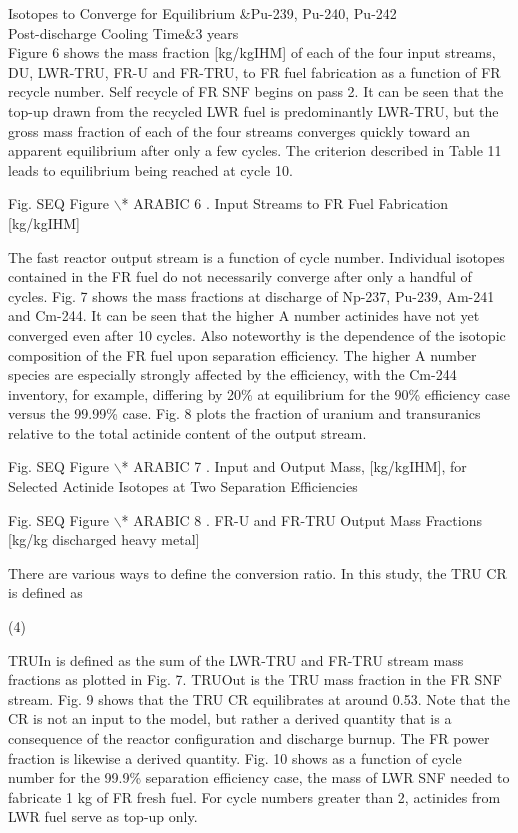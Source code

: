 Isotopes to Converge for Equilibrium &Pu-239, Pu-240, Pu-242\\

Post-discharge Cooling Time&3 years\\



	Figure 6 shows the mass fraction [kg/kgIHM] of each of the four
input streams, DU, LWR-TRU, FR-U and FR-TRU, to FR fuel fabrication as a
function of FR recycle number.  Self recycle of FR SNF begins on pass 2.
 It can be seen that the top-up drawn from the recycled LWR fuel is
predominantly LWR-TRU, but the gross mass fraction of each of the four
streams converges quickly toward an apparent equilibrium after only a
few cycles.  The criterion described in Table 11 leads to equilibrium
being reached at cycle 10.

Fig.   SEQ Figure $\backslash$* ARABIC  6 . Input Streams to FR Fuel
Fabrication [kg/kgIHM]

	The fast reactor output stream is a function of cycle number. 
Individual isotopes contained in the FR fuel do not necessarily converge
after only a handful of cycles.  Fig. 7 shows the mass fractions at
discharge of Np-237, Pu-239, Am-241 and Cm-244.  It can be seen that the
higher A number actinides have not yet converged even after 10 cycles. 
Also noteworthy is the dependence of the isotopic composition of the FR
fuel upon separation efficiency.  The higher A number species are
especially strongly affected by the efficiency, with the Cm-244
inventory, for example, differing by 20\% at equilibrium for the 90\%
efficiency case versus the 99.99\% case.  Fig. 8 plots the fraction of
uranium and transuranics relative to the total actinide content of the
output stream.

Fig.   SEQ Figure $\backslash$* ARABIC  7 .  Input and Output Mass,
[kg/kgIHM], for Selected Actinide Isotopes at Two Separation
Efficiencies

Fig.   SEQ Figure $\backslash$* ARABIC  8 . FR-U and FR-TRU Output Mass
Fractions [kg/kg discharged heavy metal]

	There are various ways to define the conversion ratio.  In this study,
the TRU CR is defined as

                     (4)

TRUIn is defined as the sum of the LWR-TRU and FR-TRU stream mass
fractions as plotted in Fig. 7.  TRUOut is the TRU mass fraction in the
FR SNF stream.  Fig. 9 shows that the TRU CR equilibrates at around
0.53.  Note that the CR is not an input to the model, but rather a
derived quantity that is a consequence of the reactor configuration and
discharge burnup.  The FR power fraction is likewise a derived quantity.
 Fig. 10 shows as a function of cycle number for the 99.9\% separation
efficiency case, the mass of LWR SNF needed to fabricate 1 kg of FR
fresh fuel.  For cycle numbers greater than 2, actinides from LWR fuel
serve as top-up only.  

